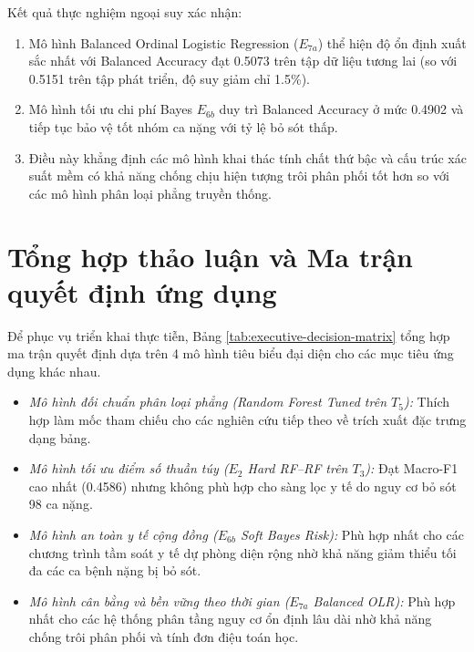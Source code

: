 

Kết quả thực nghiệm ngoại suy xác nhận:
\begin{enumerate}
    \item Mô hình Balanced Ordinal Logistic Regression ($E_{7a}$) thể hiện độ ổn định xuất sắc nhất với Balanced Accuracy đạt 0.5073 trên tập dữ liệu tương lai (so với 0.5151 trên tập phát triển, độ suy giảm chỉ 1.5\%).
    \item Mô hình tối ưu chi phí Bayes $E_{6b}$ duy trì Balanced Accuracy ở mức 0.4902 và tiếp tục bảo vệ tốt nhóm ca nặng với tỷ lệ bỏ sót thấp.
    \item Điều này khẳng định các mô hình khai thác tính chất thứ bậc và cấu trúc xác suất mềm có khả năng chống chịu hiện tượng trôi phân phối tốt hơn so với các mô hình phân loại phẳng truyền thống.
\end{enumerate}

\section{Tổng hợp thảo luận và Ma trận quyết định ứng dụng}
\label{sec:executive-matrix}

Để phục vụ triển khai thực tiễn, Bảng \ref{tab:executive-decision-matrix} tổng hợp ma trận quyết định dựa trên 4 mô hình tiêu biểu đại diện cho các mục tiêu ứng dụng khác nhau.



\begin{itemize}
    \item \textit{Mô hình đối chuẩn phân loại phẳng (Random Forest Tuned trên $T_5$):} Thích hợp làm mốc tham chiếu cho các nghiên cứu tiếp theo về trích xuất đặc trưng dạng bảng.
    \item \textit{Mô hình tối ưu điểm số thuần túy ($E_2$ Hard RF--RF trên $T_3$):} Đạt Macro-F1 cao nhất (0.4586) nhưng không phù hợp cho sàng lọc y tế do nguy cơ bỏ sót 98 ca nặng.
    \item \textit{Mô hình an toàn y tế cộng đồng ($E_{6b}$ Soft Bayes Risk):} Phù hợp nhất cho các chương trình tầm soát y tế dự phòng diện rộng nhờ khả năng giảm thiểu tối đa các ca bệnh nặng bị bỏ sót.
    \item \textit{Mô hình cân bằng và bền vững theo thời gian ($E_{7a}$ Balanced OLR):} Phù hợp nhất cho các hệ thống phân tầng nguy cơ ổn định lâu dài nhờ khả năng chống trôi phân phối và tính đơn điệu toán học.
\end{itemize}
